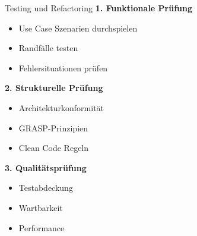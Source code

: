
\begin{KR}{Testing und Refactoring}
\textbf{1. Funktionale Prüfung}
\begin{itemize}
    \item Use Case Szenarien durchspielen
    \item Randfälle testen
    \item Fehlersituationen prüfen
\end{itemize}

\textbf{2. Strukturelle Prüfung}
\begin{itemize}
    \item Architekturkonformität
    \item GRASP-Prinzipien
    \item Clean Code Regeln
\end{itemize}

\textbf{3. Qualitätsprüfung}
\begin{itemize}
    \item Testabdeckung
    \item Wartbarkeit
    \item Performance
\end{itemize}
\end{KR}


